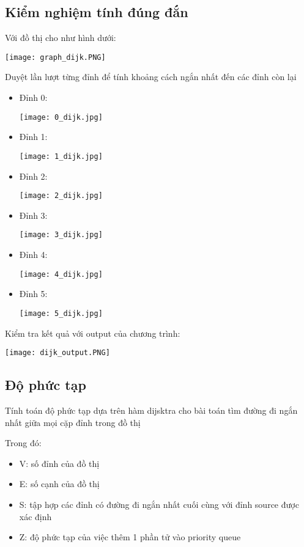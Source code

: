 \documentclass[a4paper]{article}
\begin{document}
\subsection{Kiểm nghiệm tính đúng đắn}
Với đồ thị cho như hình dưới:
\begin{center}
    \texttt{[image: graph\_dijk.PNG]}
\end{center}
Duyệt lần lượt từng đỉnh để tính khoảng cách ngắn nhất đến các đỉnh còn lại
\begin{itemize}
    \item Đỉnh 0:
    \begin{center}
        \texttt{[image: 0\_dijk.jpg]}
    \end{center}
    
    \item Đỉnh 1:
        \begin{center}
            \texttt{[image: 1\_dijk.jpg]}
        \end{center}
    \item Đỉnh 2:
        \begin{center}
            \texttt{[image: 2\_dijk.jpg]}
        \end{center}
    \item Đỉnh 3:
        \begin{center}
            \texttt{[image: 3\_dijk.jpg]}
        \end{center}
    \item Đỉnh 4:
        \begin{center}
            \texttt{[image: 4\_dijk.jpg]}
        \end{center}
    \item Đỉnh 5:
        \begin{center}
            \texttt{[image: 5\_dijk.jpg]}
        \end{center}
\end{itemize}
Kiểm tra kết quả với output của chương trình:
\begin{center}
   \texttt{[image: dijk\_output.PNG]} 
\end{center}

\subsection{Độ phức tạp}
Tính toán độ phức tạp dựa trên hàm dijsktra cho bài toán tìm đường đi ngắn nhất giữa mọi cặp đỉnh trong đồ thị

Trong đó:
\begin{itemize}
    \item V: số đỉnh của đồ thị
    \item E: số cạnh của đồ thị
    \item S: tập hợp các đỉnh có đường đi ngắn nhất cuối cùng với đỉnh source được xác định
    \item Z: độ phức tạp của việc thêm 1 phần tử vào priority queue
\end{itemize}
\end{document}
